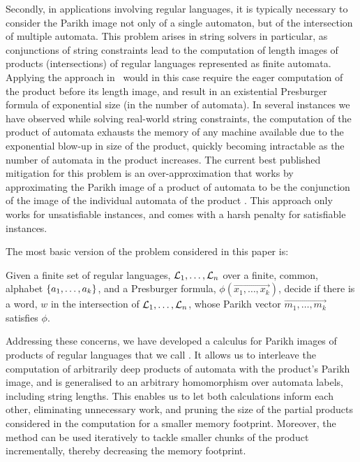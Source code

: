 Secondly, in applications involving regular languages, it is typically necessary
to consider the Parikh image not only of a single automaton, but of the
intersection of multiple automata. This problem arises in string solvers in
particular, as conjunctions of string constraints lead to the computation of
length images of products (intersections) of regular languages represented as
finite automata. Applying the approach in~\cite{generate-parikh-image} would in
this case require the eager computation of the product before its length image,
and result in an existential Presburger formula of exponential size (in the
number of automata). In several instances we have observed while solving
real-world string constraints, the computation of the product of automata
exhausts the memory of any machine available due to the exponential blow-up in
size of the product, quickly becoming intractable as the number of automata in
the product increases. The current best published mitigation for this problem is
an over-approximation that works by approximating the Parikh image of a product
of automata to be the conjunction of the image of the individual automata of the
product \cite{approximate-parikh}. This approach only works for unsatisfiable
instances, and comes with a harsh penalty for satisfiable instances.

The most basic version of the problem considered in this paper is:
{
    \centering
    \begin{tcolorbox}[colback=gray!5!white,colframe=gray!75!black,%
        title=Satisfiability of Parikh images of a product of automata,%
        width=0.8\linewidth]
        Given a finite set of regular languages, $\operatorname{\mathcal{L}}_1, \ldots, \operatorname{\mathcal{L}}_n$
        over a finite, common, alphabet $\left\{a_1, \ldots, a_k\right\}$,
        and a Presburger formula, $\phi(\Vec{x_1, \ldots, x_k})$, 
        decide if there is a word, $w$ in the 
        intersection of $\operatorname{\mathcal{L}}_1, \ldots, \operatorname{\mathcal{L}}_n$, whose Parikh vector 
        $\Vec{m_1, \ldots, m_k}$ satisfies $\phi$.
    \end{tcolorbox}
  }

Addressing these concerns, we have developed a calculus for Parikh images of
products of regular languages that we call \Calculus{}. It allows us to
interleave the computation of arbitrarily deep products of automata with the
product's Parikh image, and is generalised to an arbitrary homomorphism over
automata labels, including string lengths. This enables us to let both
calculations inform each other, eliminating unnecessary work, and pruning the
size of the partial products considered in the computation for a smaller memory
footprint. Moreover, the method can be used iteratively to tackle smaller chunks
of the product incrementally, thereby decreasing the memory footprint.

